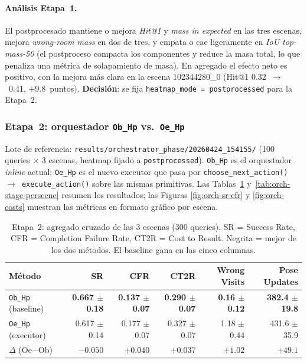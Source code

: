 \documentclass[11pt,a4paper]{article}
\begin{document}
\paragraph{Análisis Etapa~1.} El postprocesado mantiene o mejora \emph{Hit@1}
y \emph{mass in expected} en las tres escenas, mejora \emph{wrong-room mass}
en dos de tres, y empata o cae ligeramente en \emph{IoU top-mass-50} (el
postproceso compacta los componentes y reduce la masa total, lo que penaliza
una métrica de solapamiento de masa). En agregado el efecto neto es positivo,
con la mejora más clara en la escena 102344280\_0 (Hit@1 0.32~$\rightarrow$~0.41,
$+9.8$~puntos). \textbf{Decisión}: se fija \texttt{heatmap\_mode = postprocessed}
para la Etapa~2.

\subsubsection*{Etapa~2: orquestador \texttt{Ob\_Hp} vs.\ \texttt{Oe\_Hp}}

Lote de referencia: \texttt{results/orchestrator\_phase/20260424\_154155/}
(100 queries $\times$ 3 escenas, heatmap fijado a \texttt{postprocessed}).
\texttt{Ob\_Hp} es el orquestador \emph{inline} actual; \texttt{Oe\_Hp} es el
nuevo executor que pasa por \texttt{choose\_next\_action() $\rightarrow$
execute\_action()} sobre las mismas primitivas. Las
Tablas~\ref{tab:orch-stage-cross} y~\ref{tab:orch-stage-perscene} resumen los
resultados; las Figuras \ref{fig:orch-sr-cfr} y \ref{fig:orch-costs} muestran
las métricas en formato gráfico por escena.

\begin{table}[htbp]
\centering
\small
\begin{tabular}{lrrrrr}
\toprule
\textbf{Método} & \textbf{SR} & \textbf{CFR} & \textbf{CT2R} & \textbf{Wrong Visits} & \textbf{Pose Updates} \\
\midrule
\texttt{Ob\_Hp} (baseline) & \textbf{0.667 $\pm$ 0.18} & \textbf{0.137 $\pm$ 0.07} & \textbf{0.290 $\pm$ 0.07} & \textbf{0.16 $\pm$ 0.12} & \textbf{382.4 $\pm$ 19.8} \\
\texttt{Oe\_Hp} (executor) & 0.617 $\pm$ 0.14 & 0.177 $\pm$ 0.07 & 0.327 $\pm$ 0.07 & 1.18 $\pm$ 0.44 & 431.6 $\pm$ 35.9 \\
\midrule
$\Delta$ (Oe$-$Ob) & $-0.050$ & $+0.040$ & $+0.037$ & $+1.02$ & $+49.1$ \\
\bottomrule
\end{tabular}
\caption{Etapa~2: agregado cruzado de las 3 escenas (300 queries). SR =
Success Rate, CFR = Completion Failure Rate, CT2R = Cost to Result. Negrita
= mejor de los dos métodos. El baseline gana en las cinco columnas.}
\label{tab:orch-stage-cross}
\end{table}
\end{document}
